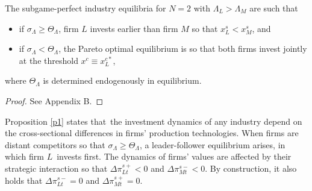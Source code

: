 \documentclass[nogrid,nosurname,sort&compress]{RFS}
\begin{document}
\begin{proposition}\label{p1}
The subgame-perfect industry equilibria for $N=2$ with $\Lambda _{L}>\Lambda _{M} $ are such that
\begin{itemize}
\item if $\sigma _{\Lambda }\geq \Theta _{\Lambda }$, firm $L$ invests
earlier than firm $M$ so that $x_{L}^{s}<x_{M}^{s}$, and
\item if $\sigma _{\Lambda }<\Theta _{\Lambda }$, the Pareto optimal
equilibrium is so that both firms invest jointly at the threshold $%
x^{c}\equiv x_{L}^{c\ast }$,
\end{itemize}
\end{proposition}
\noindent where $\Theta _{\Lambda }$ is determined endogenously in equilibrium.
\begin{proof}
See Appendix B.
\end{proof}

Proposition \ref{p1} states that\ the investment dynamics of any industry depend on the
cross-sectional differences in firms' production technologies. When firms are distant
competitors so that $\sigma _{\Lambda }\geq \Theta _{\Lambda }$, a leader-follower equilibrium
arises, in which firm $L$\ invests first. The dynamics of firms' values are affected by their
strategic interaction so that $\Delta \pi _{Lt}^{s+}<0$ and $\Delta \pi _{Mt}^{s-}<0$. By
construction, it also holds that $\Delta \pi _{Lt}^{s-}=0 $ and $\Delta \pi _{Mt}^{s+}=0$.
\end{document}
